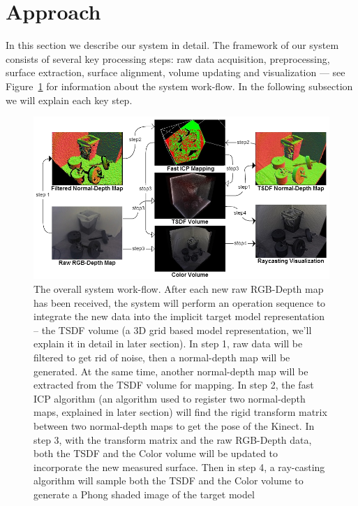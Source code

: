 \documentclass[12pt]{article}
\begin{document}
\section{Approach}
In this section we describe our system in detail. The framework of our system consists of several key processing steps: raw data acquisition, preprocessing, surface extraction, surface alignment, volume updating and visualization --- see Figure~\ref{fig:framework} for information about the system work-flow. In the following subsection we will explain each key step.

\begin{figure}[h!]
\includegraphics[width=\textwidth]{work-flow.png}
\caption{\label{fig:framework}The overall system work-flow. After each new raw RGB-Depth map has been received, the system will perform an operation sequence to integrate the new data into the implicit target model representation -- the TSDF volume (a 3D grid based model representation, we'll explain it in detail in later section). In step 1, raw data will be filtered to get rid of noise, then a normal-depth map will be generated. At the same time, another normal-depth map will be extracted from the TSDF volume for mapping. In step 2, the fast ICP algorithm (an algorithm used to register two normal-depth maps, explained in later section) will find the rigid transform matrix between two normal-depth maps to get the pose of the Kinect. In step 3, with the transform matrix and the raw RGB-Depth data, both the TSDF and the Color volume will be updated to incorporate the new measured surface. Then in step 4, a ray-casting algorithm will sample both the TSDF and the Color volume to generate a Phong shaded image of the target model}
\end{figure}
\end{document}
